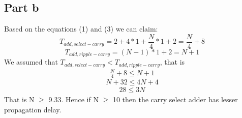 \documentclass{article}
\begin{document}
\subsection*{Part b}
Based on the equations (1) and (3) we can claim:
\begin{equation}
    T_{add,select-carry} = 2 + 4*1 + \frac{N}{4} * 1 + 2 = \frac{N}{4} + 8
\end{equation}
\begin{equation}
    T_{add, ripple-carry} = (N-1) * 1 + 2 = N + 1
\end{equation}
We assumed that $T_{add,select-carry} < T_{add, ripple-carry}$, that is
\begin{eqnarray}
    \frac{N}{4}  + 8 \leq N + 1
\end{eqnarray}
\begin{equation}
    N + 32 \leq 4N + 4
\end{equation}
\begin{eqnarray}
    28 \leq 3N
\end{eqnarray}
That is N $\geq$ 9.33. Hence if N $\geq$ 10 then the carry select adder has lesser propagation delay.
\end{document}
